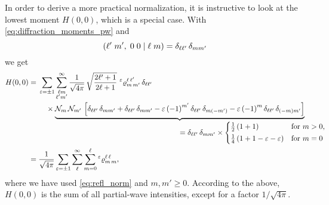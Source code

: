 In order to derive a more practical normalization, it is instructive
to look at the lowest moment $H(0, 0)$, which is a special case.  With
\cref{eq:diffraction_moments_pw} and
\begin{equation}
  ({\ell'}\;{m'},\;{0}\;{0}\; |\; {\ell}\;{m})
  = \delta_{\ell \ell'}\, \delta_{m m'}
\end{equation}
we get
\begin{align}
  H(0, 0)
  ={}& \begin{multlined}[t]
    \sum_{\refl = \pm 1} \sum_{\substack{\ell m \\ \ell' m'}}^\infty
    \frac{1}{\sqrt{4 \pi}}\, \sqrt{\frac{2 \ell' + 1}{2 \ell + 1}}\,
      \prescript{\refl}{}{\varrho}^{\ell\, \ell'}_{m\, m'}\, \delta_{\ell \ell'} \\
      \times \rdUnderbrace{\mathcal{N}_m\, \mathcal{N}_{m'}\, \sBrk[2]{%
        \delta_{\ell \ell'}\, \delta_{m m'}
        + \delta_{\ell \ell'}\, \delta_{m m'}
        - \refl\, {(-1)}^{m'}\, \delta_{\ell \ell'}\, \delta_{m (-m')}
        - \refl\, {(-1)}^m\, \delta_{\ell \ell'}\, \delta_{(-m) m'}}}%
        {= \delta_{\ell \ell'}\, \delta_{m m'} \times
        \begin{cases*}
          \frac{1}{2}\, (1 + 1)                 & for $m > 0$, \\
          \frac{1}{4}\, (1 + 1 - \refl - \refl) & for $m = 0$
        \end{cases*}}
  \end{multlined} \notag
  \\
  \label{eq:diffraction_moment_00_pw}
  ={}& \frac{1}{\sqrt{4 \pi}} \sum_{\refl = \pm 1} \sum_\ell^\infty \sum_{m = 0}^\ell \prescript{\refl}{}{\varrho}^{\ell\, \ell}_{m\, m},
\end{align}
where we have used \cref{eq:refl_norm} and $m, m' \geq 0$.  According
to the above, $H(0, 0)$ is the sum of all partial-wave
intensities, except for a factor $1 / \sqrt{4 \pi}$.

